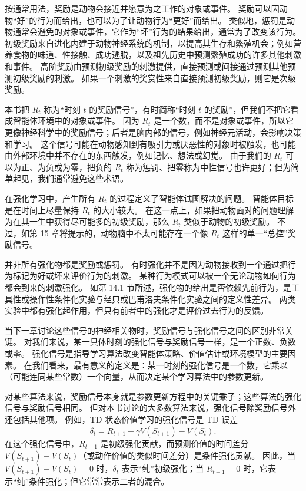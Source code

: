 \documentclass[UTF8, 12pt, fontset=fandol, oneside]{ctexart}
\begin{document}
按通常用法，奖励是动物会接近并愿意为之工作的对象或事件。
奖励可以因动物“好”的行为而给出，也可以为了让动物行为“更好”而给出。
类似地，惩罚是动物通常会避免的对象或事件，它作为“坏”行为的结果给出，通常为了改变该行为。
初级奖励来自进化内建于动物神经系统的机制，以提高其生存和繁殖机会；例如营养食物的味道、性接触、成功逃脱，以及祖先历史中预测繁殖成功的许多其他刺激和事件。
高阶奖励由预测初级奖励的刺激提供，直接预测或间接通过预测其他预测初级奖励的刺激。
如果一个刺激的奖赏性来自直接预测初级奖励，则它是次级奖励。

本书把 $R_t$ 称为“时刻 $t$ 的奖励信号”，有时简称“时刻 $t$ 的奖励”，但我们不把它看成智能体环境中的对象或事件。
因为 $R_t$ 是一个数，而不是对象或事件，所以它更像神经科学中的奖励信号；后者是脑内部的信号，例如神经元活动，会影响决策和学习。
这个信号可能在动物感知到有吸引力或厌恶性的对象时被触发，也可能由外部环境中并不存在的东西触发，例如记忆、想法或幻觉。
由于我们的 $R_t$ 可以为正、为负或为零，把负的 $R_t$ 称为惩罚、把零称为中性信号也许更好；但为简单起见，我们通常避免这些术语。

在强化学习中，产生所有 $R_t$ 的过程定义了智能体试图解决的问题。
智能体目标是在时间上尽量保持 $R_t$ 的大小较大。
在这一点上，如果把动物面对的问题理解为在其一生中获得尽可能多的初级奖励，那么 $R_t$ 类似于动物的初级奖励。
不过，如第 15 章将提示的，动物脑中不太可能存在一个像 $R_t$ 这样的单一“总控”奖励信号。

并非所有强化物都是奖励或惩罚。
有时强化并不是因为动物接收到一个通过把行为标记为好或坏来评价行为的刺激。
某种行为模式可以被一个无论动物如何行为都会到来的刺激强化。
如第 14.1 节所述，强化物的给出是否依赖先前行为，是工具性或操作性条件化实验与经典或巴甫洛夫条件化实验之间的定义性差异。
两类实验中都有强化起作用，但只有前者中的强化才是评价过去行为的反馈。

当下一章讨论这些信号的神经相关物时，奖励信号与强化信号之间的区别非常关键。
对我们来说，某一具体时刻的强化信号与奖励信号一样，是一个正数、负数或零。
强化信号是指导学习算法改变智能体策略、价值估计或环境模型的主要因素。
在我们看来，最有意义的定义是：某一时刻的强化信号是一个数，它乘以（可能连同某些常数）一个向量，从而决定某个学习算法中的参数更新。

对某些算法来说，奖励信号本身就是参数更新方程中的关键乘子；这些算法的强化信号与奖励信号相同。
但对本书讨论的大多数算法来说，强化信号除奖励信号外还包括其他项。
例如，TD 状态价值学习的强化信号是 TD 误差
\[
\delta_t=R_{t+1}+\gamma V(S_{t+1})-V(S_t).
\]
在这个强化信号中，$R_{t+1}$ 是初级强化贡献，而预测价值的时间差分 $V(S_{t+1})-V(S_t)$（或动作价值的类似时间差分）是条件强化贡献。
因此，当 $V(S_{t+1})-V(S_t)=0$ 时，$\delta_t$ 表示“纯”初级强化；当 $R_{t+1}=0$ 时，它表示“纯”条件强化；但它常常表示二者的混合。
\end{document}
